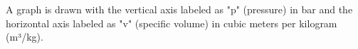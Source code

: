 A graph is drawn with the vertical axis labeled as "p" (pressure) in bar and the horizontal axis labeled as "v" (specific volume) in cubic meters per kilogram (m³/kg).